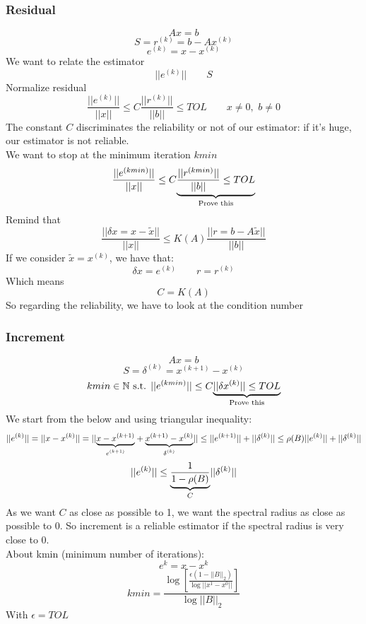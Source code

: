     \subsubsection{Residual}
    $$
    Ax=b
    $$
    $$
    S=r^{(k)}=b-Ax^{(k)}
    $$
    $$
    e^{(k)}=x-x^{(k)}
    $$
    We want to relate the estimator
    $$
    ||e^{(k)}||\qquad S
    $$
    Normalize residual
    $$
    \frac{
        ||e^{(k)}||
    }{
        ||x||
    }
    \leq
    C
    \frac{
        ||r^{(k)}||
    }{
        ||b||
    }
    \leq
    TOL\qquad
    x\neq 0,\,\,b\neq 0
    $$
    The constant $C$ discriminates the reliability or not of our estimator: if it's huge, our estimator is not reliable.\\
    We want to stop at the minimum iteration $kmin$
    $$
    \frac{
        ||e^{(kmin)}||
    }{
        ||x||
    }
    \leq
    C
    \underlabel{
        \frac{
            ||r^{(kmin)}||
        }{
            ||b||
        }
        \leq
        TOL
    }{
        Prove this
    }
    $$
    Remind that
    $$
    \frac{
        ||\delta x=x-\tilde{x}||
    }{
        ||x||
    }
    \leq
    K(A)
    \frac{
        ||r=b-A\tilde{x}||
    }{
        ||b||
    }
    $$
    If we consider $\tilde{x}=x^{(k)}$, we have that:
    $$
    \delta x = e^{(k)}\qquad r = r^{(k)}
    $$
    Which means
    $$
    C=K(A)
    $$
    So regarding the reliability, we have to look at the condition number

    \subsubsection{Increment}
    $$
    Ax=b
    $$
    $$
    S=\delta^{(k)}=x^{(k+1)}-x^{(k)}
    $$
    $$
    kmin\in\mathbb{N}\text{ s.t. }
    ||e^{(kmin)}||\leq C
    \underlabel{
        ||\delta x^{(k)}||\leq TOL
    }{Prove this}
    $$
    We start from the below and using triangular inequality:
    $$
    ||e^{(k)}||=||x-x^{(k)}||=
    ||
    \underlabel{
        x-x^{(k+1)}
    }{$e^{(k+1)}$}
    +
    \underlabel{
        x^{(k+1)}-x^{(k)}
    }{$\delta^{(k)}$}
    ||
    \leq
    ||e^{(k+1)}||+||\delta^{(k)}||
    \leq
    \rho(B)||e^{(k)}||+||\delta^{(k)}||
    $$
    $$
    ||e^{(k)}||
    \leq
    \underlabel{
        \frac{
            1
        }{1-\rho(B)}
    }{$C$}
    ||\delta^{(k)}||
    $$
    As we want $C$ as close as possible to 1, we want the spectral radius as close as possible to 0. So increment is a reliable estimator if the spectral radius is very close to 0.\\
    About kmin (minimum number of iterations):
    $$
    e^k=x-x^k
    $$
    $$
    kmin = \frac{
        \log\left[
            \frac{
                \epsilon(1-||B||_2)
            }{
                \log||x^1-x^0||
            }
        \right]
    }{
        \log||B||_2
    }
    $$
    With $\epsilon=TOL$